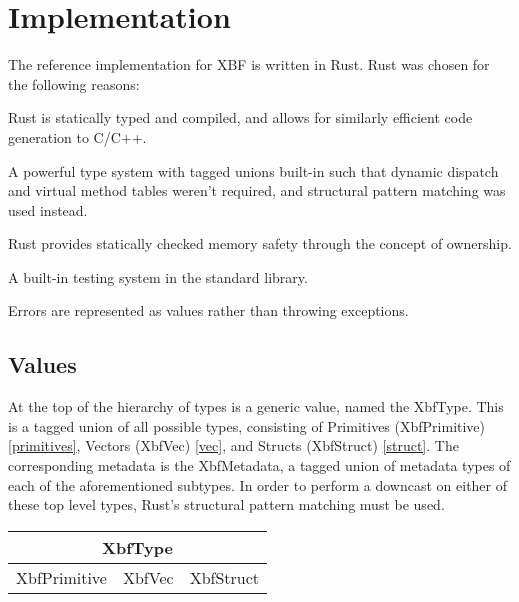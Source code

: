 \documentclass[conference]{IEEEtran}
\begin{document}
\section{Implementation}

The reference implementation for XBF\cite{xbf_impl} is written in Rust\cite{rust}. Rust was chosen for the following reasons:

\begin{IEEEitemize}
	\item Rust is statically typed and compiled, and allows for similarly efficient code generation to C/C++.
	\item A powerful type system with tagged unions built-in\cite{enums} such that dynamic dispatch and virtual method tables weren't required, and structural pattern matching was used instead.
	\item Rust provides statically checked memory safety through the concept of ownership\cite{ownership}.
	\item A built-in testing system in the standard library\cite{testing}.
	\item Errors are represented as values rather than throwing exceptions\cite{results}.
\end{IEEEitemize}

\subsection{Values}

At the top of the hierarchy of types is a generic value, named the XbfType. This is a tagged union of all possible types, consisting of Primitives (XbfPrimitive) \ref{primitives}, Vectors (XbfVec)
\ref{vec}, and Structs (XbfStruct) \ref{struct}. The corresponding metadata is the XbfMetadata, a tagged union of metadata types of each of the aforementioned subtypes. In order to perform a downcast on either of these top level types, Rust's structural pattern matching must be used.

\begin{table}[htbp]
	\begin{center}
		\begin{tabular}{|c|c|c|}
			\hline
			\multicolumn{3}{|c|}{XbfType}     \\
			\hline
			XbfPrimitive & XbfVec & XbfStruct \\
			\hline
		\end{tabular}
	\end{center}
\end{table}
\end{document}
